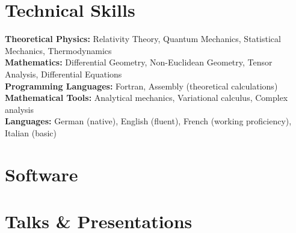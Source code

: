 \documentclass[letterpaper,11pt]{article}
\begin{document}


\ifcv
\section*{Technical Skills}

\textbf{Theoretical Physics:} Relativity Theory, Quantum Mechanics, Statistical Mechanics, Thermodynamics \\
\textbf{Mathematics:} Differential Geometry, Non-Euclidean Geometry, Tensor Analysis, Differential Equations \\
\textbf{Programming Languages:} Fortran, Assembly (theoretical calculations) \\
\textbf{Mathematical Tools:} Analytical mechanics, Variational calculus, Complex analysis \\
\textbf{Languages:} German (native), English (fluent), French (working proficiency), Italian (basic)
\fi


\ifcv
\section*{Software}

\begin{itemize}
\end{itemize}
\fi


\ifcv
\section*{Talks \& Presentations}
\end{document}
